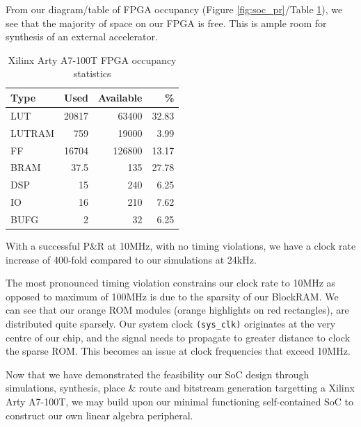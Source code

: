 \documentclass[a4paper,8pt]{report}
\begin{document}
From our diagram/table of FPGA occupancy (Figure \ref{fig:soc_pr}/Table
\ref{table:soc_pr}), we see that the majority of space on our FPGA is
free. This is ample room for synthesis of an external accelerator.
\begin{table}[b]
  \centering
  \begin{tabular}{l|r|r|r}
    \toprule
    Type  & Used & Available & \% \\
    \midrule
    LUT   &	20817&	63400	&32.83 \\
    LUTRAM&	759	 &19000	  &3.99 \\
    FF	  &16704 &126800	&13.17 \\
    BRAM	&37.5	 &135	    &27.78 \\
    DSP	  &15	   &240	    &6.25 \\ 
    IO	  &16	   &210	    &7.62\\ 
    BUFG	&2	   &32	    &6.25\\
    \bottomrule
  \end{tabular}
  \caption{Xilinx Arty A7-100T FPGA occupancy statistics}
  \label{table:soc_pr}
\end{table}

With a successful P\&R at 10MHz, with no timing violations, we have a clock rate
increase of 400-fold compared to our simulations at 24kHz.

The most pronounced timing violation constrains our clock rate to 10MHz as
opposed to maximum of 100MHz is due to the sparsity of our BlockRAM. We can see
that our orange ROM modules (orange highlights on red rectangles), are
distributed quite sparsely. Our system clock \texttt{(sys\_clk)} originates at
the very centre of our chip, and the signal needs to propagate to greater
distance to clock the sparse ROM. This becomes an issue at clock frequencies
that exceed 10MHz.

Now that we have demonstrated the feasibility our SoC design through
simulations, synthesis, place \& route and bitstream generation targetting a
Xilinx Arty A7-100T, we may build upon our minimal functioning self-contained
SoC to construct our own linear algebra peripheral.
\end{document}
